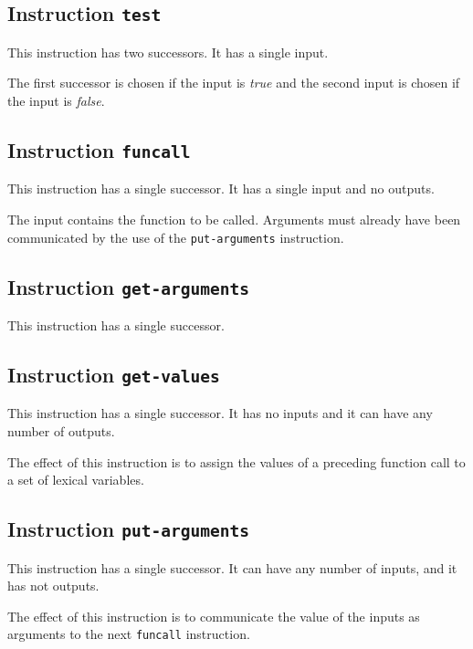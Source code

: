 \subsection{Instruction \texttt{test}}
\label{mir-instruction-test}

This instruction has two successors.  It has a single input. 

The first successor is chosen if the input is \emph{true} and the
second input is chosen if the input is \emph{false}.%

\subsection{Instruction \texttt{funcall}}
\label{mir-instruction-funcall}

This instruction has a single successor.  It has a single input and no
outputs.

The input contains the function to be called.  Arguments must already
have been communicated by the use of the \texttt{put-arguments}
instruction. 

\subsection{Instruction \texttt{get-arguments}}
\label{mir-instruction-get-arguments}

This instruction has a single successor.%

\subsection{Instruction \texttt{get-values}}
\label{mir-instruction-get-values}

This instruction has a single successor.  It has no inputs and it can
have any number of outputs.

The effect of this instruction is to assign the values of a preceding
function call to a set of lexical variables. 

\subsection{Instruction \texttt{put-arguments}}
\label{mir-instruction-put-arguments}

This instruction has a single successor.  It can have any number of
inputs, and it has not outputs. 

The effect of this instruction is to communicate the value of the
inputs as arguments to the next \texttt{funcall}
instruction. 

